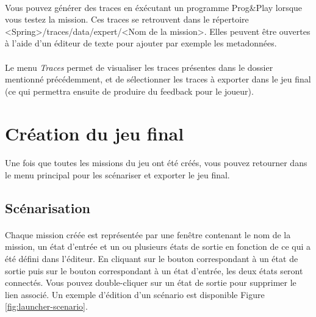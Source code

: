 \documentclass[a4paper]{article}
\begin{document}
\paragraph{ }
Vous pouvez générer des traces en éxécutant un programme Prog\&Play lorsque vous testez la mission. Ces traces se retrouvent dans le répertoire <Spring>/traces/data/expert/<Nom de la mission>. Elles peuvent être ouvertes à l'aide d'un éditeur de texte pour ajouter par exemple les metadonnées.
\paragraph{ }
Le menu \textit{Traces} permet de visualiser les traces présentes dans le dossier mentionné précédemment, et de sélectionner les traces à exporter dans le jeu final (ce qui permettra ensuite de produire du feedback pour le joueur).
\section{Création du jeu final}
\paragraph{ }
Une fois que toutes les missions du jeu ont été créés, vous pouvez retourner dans le menu principal pour les scénariser et exporter le jeu final.
\subsection{Scénarisation}\label{scenario-editor}
\paragraph{ }
Chaque mission créée est représentée par une fenêtre contenant le nom de la mission, un état d'entrée et un ou plusieurs états de sortie en fonction de ce qui a été défini dans l'éditeur. En cliquant sur le bouton correspondant à un état de sortie puis sur le bouton correspondant à un état d'entrée, les deux états seront connectés. Vous pouvez double-cliquer sur un état de sortie pour supprimer le lien associé. Un exemple d'édition d'un scénario est disponible Figure \ref{fig:launcher-scenario}.
\end{document}
